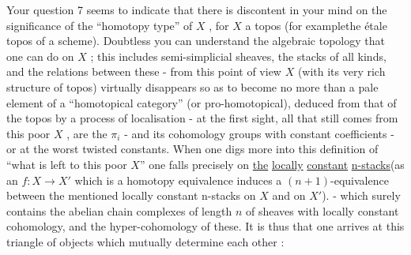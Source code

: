 
Your question 7 seems to indicate that there is discontent in
your mind on the significance of the ``homotopy type'' of $X$ , for
$X$ a topos (for examplethe étale topos of a scheme). Doubtless
you can understand the algebraic topology that one can do on $X$ ;
this includes semi-simplicial sheaves, the stacks of all kinds, and
the relations between these - from this point of view $X$ (with
its very rich structure of topos) virtually disappears so as to
become no more than a pale element of a ``homotopical category''
(or pro-homotopical), deduced from that of the topos by a process
of localisation
- at the first sight, all that still comes from this poor $X$ , are
the $\pi_i$ - and its cohomology groups with constant coefficients -
or at the worst twisted constants. When one digs more into this
definition of ``what is left to this poor $X$'' one falls precisely
on \uline{the} \uline{locally} \uline{constant} \uline{n-stacks}(as an $f : X \to X'$ which is a
homotopy equivalence induces a $(n+1)$-equivalence between the
mentioned locally constant n-stacks on $X$ and on $X'$). - which surely
contains the abelian chain complexes of length $n$ of sheaves with
locally constant cohomology, and the hyper-cohomology of these.
It is thus that one arrives at this triangle of objects which
mutually determine each other :



